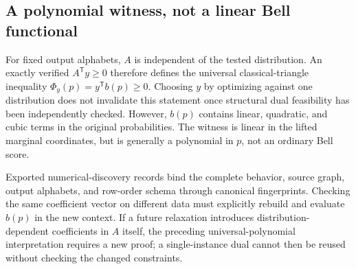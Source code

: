 \subsection{A polynomial witness, not a linear Bell functional}
For fixed output alphabets, $A$ is independent of the tested distribution.
An exactly verified $A^{\mathsf T}y\geq0$ therefore defines the universal
classical-triangle inequality $\Phi_y(p)=y^{\mathsf T}b(p)\geq0$.
Choosing $y$ by optimizing against one distribution does not invalidate
this statement once structural dual feasibility has been independently
checked. However, $b(p)$ contains linear, quadratic, and cubic terms in the
original probabilities. The witness is linear in the lifted marginal
coordinates, but is generally a polynomial in $p$, not an ordinary Bell
score.

Exported numerical-discovery records bind the complete behavior,
source graph, output alphabets, and row-order schema through canonical
fingerprints. Checking the same coefficient vector on different data must
explicitly rebuild and evaluate $b(p)$ in the new context. If a future
relaxation introduces distribution-dependent coefficients in $A$ itself,
the preceding universal-polynomial interpretation requires a new proof;
a single-instance dual cannot then be reused without checking the changed
constraints.
